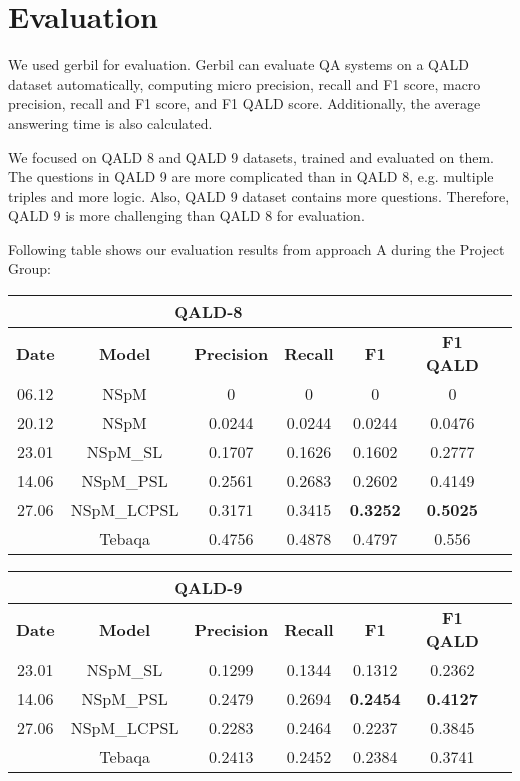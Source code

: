 
\section{Evaluation}

We used gerbil for evaluation.
Gerbil can evaluate QA systems on a QALD dataset automatically,
computing micro precision, recall and F1 score, 
macro precision, recall and F1 score,
and F1 QALD score. 
Additionally, the average answering time is also calculated. 

We focused on QALD 8 and QALD 9 datasets, trained and evaluated on them. 
The questions in QALD 9 are more complicated than in QALD 8, 
e.g. multiple triples and more logic. 
Also, QALD 9 dataset contains more questions.
Therefore, QALD 9 is more challenging than QALD 8 for evaluation. 

Following table shows our evaluation results from approach A during the Project Group:

\begin{tabular}{ccccccc} \hline
    \multicolumn{5}{c}{QALD-8} \\ \hline
    \textbf{Date} & \textbf{Model}  & \textbf{Precision} & \textbf{Recall} & \textbf{F1} & \textbf{F1 QALD} \\ \hline
    06.12       & NSpM          & 0         & 0         & 0         & 0         \\
    20.12       & NSpM          & 0.0244    & 0.0244    & 0.0244    & 0.0476    \\
    23.01       & NSpM\_SL       & 0.1707    & 0.1626    & 0.1602    & 0.2777    \\
    14.06       & NSpM\_PSL      & 0.2561    & 0.2683    & 0.2602    & 0.4149    \\
    27.06       & NSpM\_LCPSL    & 0.3171    & 0.3415    & \textbf{0.3252}    & \textbf{0.5025}    \\
    \hline
                & Tebaqa        & 0.4756     & 0.4878    & 0.4797   & 0.556   \\
    \hline
\end{tabular}

\begin{tabular}{ccccccc} \hline
    \multicolumn{5}{c}{QALD-9} \\ \hline
    \textbf{Date} & \textbf{Model}  & \textbf{Precision} & \textbf{Recall} & \textbf{F1} & \textbf{F1 QALD} \\ \hline
    23.01       & NSpM\_SL       & 0.1299    & 0.1344    & 0.1312    & 0.2362    \\
    14.06       & NSpM\_PSL      & 0.2479    & 0.2694	 & \textbf{0.2454}    & \textbf{0.4127}    \\
    27.06       & NSpM\_LCPSL    & 0.2283    & 0.2464    & 0.2237    & 0.3845    \\
    \hline
                & Tebaqa        & 0.2413    & 0.2452    & 0.2384    & 0.3741  \\
    \hline
\end{tabular}

